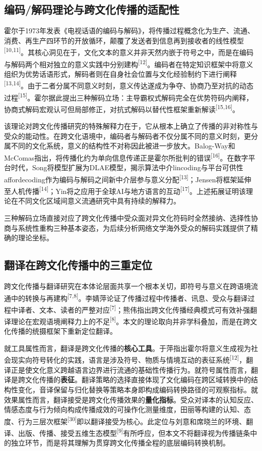 \documentclass[12pt, a4paper]{article}
\newcommand{\citemark}[1]{\textsuperscript{[#1]}}
\begin{document}
\subsection{编码/解码理论与跨文化传播的适配性}

霍尔于1973年发表《电视话语的编码与解码》，将传播过程概念化为生产、流通、消费、再生产四环节的开放循环，颠覆了发送者到信息再到接收者的线性模型\citemark{10,11}。其核心洞见在于，文化文本的意义并非天然内嵌于符号之中，而是在编码与解码两个相对独立的意义实践中分别建构\citemark{12}。编码者在特定知识框架中将意义组织为优势话语形式，解码者则在自身社会位置与文化经验制约下进行阐释\citemark{13,14}。由于二者分属不同意义时刻，意义传达遂成为争夺、协商乃至对抗的动态过程\citemark{15}。霍尔据此提出三种解码立场：主导霸权式解码完全在优势符码内阐释，协商式解码宏观认可但局部修正，对抗式解码以替代性框架重新解读\citemark{15,16}。

该理论对跨文化传播研究的特殊解释力在于，它从根本上确立了传播的非对称性与受众的能动性。在跨文化语境中，编码者与解码者不仅分属不同的意义时刻，更分属不同的文化系统，意义的结构性不对称因此被进一步放大。Balog-Way和McComas指出，将传播化约为单向信息传递正是霍尔所批判的错误\citemark{16}。在数字平台时代，Song将模型扩展为DLAE模型，揭示算法中介lincoding与平台可供性affordecoding作为编码与解码之间新中介层参与意义分配\citemark{13}；Jensen将框架延伸至人机传播\citemark{14}；Yin将之应用于全球AI与地方语言的互动\citemark{17}。上述拓展证明该理论在不同文化区域间意义流通研究中具有持续的解释力。

三种解码立场直接对应了跨文化传播中受众面对异文化符码时全然接纳、选择性协商与系统性重构三种基本姿态，为后续分析网络文学海外受众的解码实践提供了精确的理论坐标。

\subsection{翻译在跨文化传播中的三重定位}

跨文化传播与翻译研究在本体论层面共享一个根本关切，即符号与意义在跨语境流通中的转换与再建构\citemark{7,8}。李婧萍论证了传播过程中传播者、讯息、受众与翻译过程中译者、文本、读者的严整对应\citemark{7}；熊伟指出跨文化传播经典模式可有效补强翻译理论在宏观语境阐释力上的不足\citemark{8}。本文的理论取向并非学科叠加，而是在跨文化传播的统摄框架下重新定位翻译。

就工具属性而言，翻译是跨文化传播的\textbf{核心工具}。于萍指出霍尔将意义生成视为社会现实向符号转化的实践，语言是涉及符号、物质与情境互动的表征系统\citemark{12}，翻译正是使文化意义跨越语言边界进行流通的基础性传播行为。就符号属性而言，翻译是跨文化传播的\textbf{表征}。翻译策略的选择直接体现了文化编码在跨区域转换中的结构性变化，音译保留与归化替换等策略本身即构成编码转换路径的可观察指标。就效果属性而言，翻译接受是跨文化传播效果的\textbf{量化指标}。受众对译本的认知反应、情感态度与行为倾向构成传播成效的可操作化测量维度，田丽等构建的认知、态度、行为三层次框架\citemark{30}即以翻译接受为核心。此定位与刘意和席晓兰的环境、翻译、出版、传播、接受五维生态模型\citemark{9}有所呼应，但本文不将翻译视为传播链条中的独立环节，而是将其理解为贯穿跨文化传播全程的底层编码转换机制。
\end{document}
